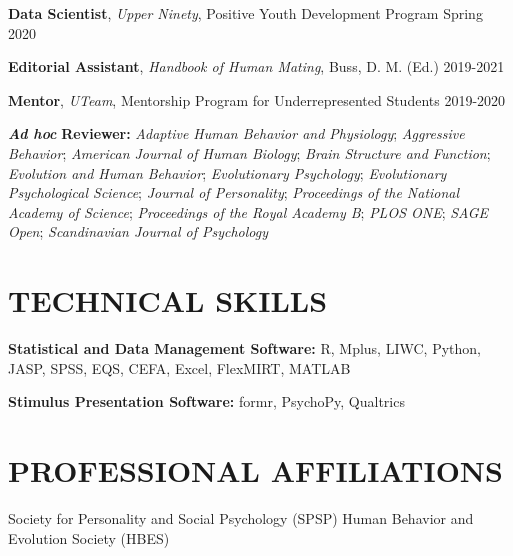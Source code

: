 \documentclass[10pt,]{article}
\begin{document}
\textbf{Data Scientist}, \emph{Upper Ninety}, Positive Youth Development
Program \hfill \textcolor{light-gray}{Spring 2020}

\textbf{Editorial Assistant}, \emph{Handbook of Human Mating}, Buss, D.
M. (Ed.) \hfill \textcolor{light-gray}{2019-2021}

\textbf{Mentor}, \emph{UTeam}, Mentorship Program for Underrepresented
Students \hfill \textcolor{light-gray}{2019-2020}

\textbf{\emph{Ad hoc}} \textbf{Reviewer:} \newline \emph{Adaptive Human
Behavior and Physiology}; \emph{Aggressive Behavior}; \emph{American
Journal of Human Biology}; \emph{Brain Structure and Function};
\emph{Evolution and Human Behavior}; \emph{Evolutionary Psychology};
\emph{Evolutionary Psychological Science}; \emph{Journal of
Personality}; \emph{Proceedings of the National Academy of Science};
\emph{Proceedings of the Royal Academy B}; \emph{PLOS ONE}; \emph{SAGE
Open}; \emph{Scandinavian Journal of Psychology}

\hypertarget{technical-skills}{%
\section{TECHNICAL SKILLS}\label{technical-skills}}

\textbf{Statistical and Data Management Software:} R, Mplus, LIWC,
Python, JASP, SPSS, EQS, CEFA, Excel, FlexMIRT, MATLAB

\textbf{Stimulus Presentation Software:} formr, PsychoPy, Qualtrics

\hypertarget{professional-affiliations}{%
\section{PROFESSIONAL AFFILIATIONS}\label{professional-affiliations}}

Society for Personality and Social Psychology (SPSP) \newline Human
Behavior and Evolution Society (HBES)
\end{document}
